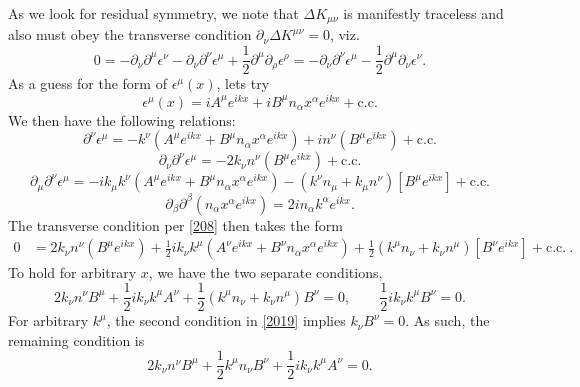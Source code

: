 \documentclass[10pt,letterpaper]{article}
\numberwithin{equation}{subsection}
\begin{document}
As we look for residual symmetry, we note that $\Delta K_{\mu\nu}$ is manifestly traceless and also must obey the transverse condition $\partial_\nu \Delta K^{\mu\nu}=0$, viz.
\begin{equation}
	0=-\partial_\nu \partial^\mu \epsilon^\nu - \partial_\nu \partial^\nu \epsilon^\mu + \frac12 \partial^\mu \partial_\rho \epsilon^\rho =
	-\partial_\nu \partial^\nu \epsilon^\mu - \frac12 \partial^\mu \partial_\nu \epsilon^\nu .\label{208}
\end{equation}
As a guess for the form of $\epsilon^\mu(x)$, lets try
\begin{equation}
\epsilon^\mu(x) = i A^\mu e^{ikx} + iB^\mu n_\alpha x^\alpha e^{ikx} + \text{c.c.}
\end{equation}
We then have the following relations:
\begin{equation}
\partial^\nu \epsilon^\mu = - k^\nu\left(A^\mu e^{ikx} + B^\mu n_\alpha x^\alpha e^{ikx}\right)+ 
i n^\nu \left(  B^\mu  e^{ikx} \right)+ \text{c.c.}
\end{equation}
\begin{equation}
\partial_\nu \partial^\nu \epsilon^\mu = -2k_\nu n^\nu \left(B^\mu  e^{ikx}\right)+\text{c.c.}
\end{equation}
\begin{equation}
\partial_\mu \partial^\nu \epsilon^\mu = -i k_\mu k^\nu\left(A^\mu e^{ikx} +  B^\mu n_\alpha x^\alpha e^{ikx}\right)
- (k^\nu n_\mu+k_\mu n^\nu)\left[ B^\mu e^{ikx}\right] + \text{c.c.}
\end{equation}
\begin{equation}
\partial_\beta \partial^\beta (n_\alpha x^\alpha e^{ikx}) = 2i n_\alpha k^\alpha e^{ikx}.
\end{equation}
The transverse condition per \eqref{208} then takes the form
\begin{align}
0 {}&= 2k_\nu n^\nu \left(B^\mu  e^{ikx}\right)+\frac12 i k_\nu k^\mu\left(A^\nu e^{ikx} +  B^\nu n_\alpha x^\alpha e^{ikx}\right)
+\frac12 (k^\mu n_\nu+k_\nu n^\mu)\left[ B^\nu e^{ikx}\right]+ \text{c.c.}\ .
\end{align}
To hold for arbitrary $x$, we have the two separate conditions,
\begin{equation}
2k_\nu n^\nu B^\mu +\frac12 ik_\nu k^\mu A^\nu + \frac12 (k^\mu n_\nu+k_\nu n^\mu)B^\nu=0,\qquad \frac12 ik_\nu k^\mu B^\nu=0.\label{2019}
\end{equation}
For arbitrary $k^\mu$, the second condition in \ref{2019} implies $k_\nu B^\nu = 0$. As such, the remaining condition is
\begin{equation}
2k_\nu n^\nu B^\mu + \frac12 k^\mu n_\nu B^\nu + \frac12 i k_\nu k^\mu A^\nu = 0.
\end{equation}
\end{document}

